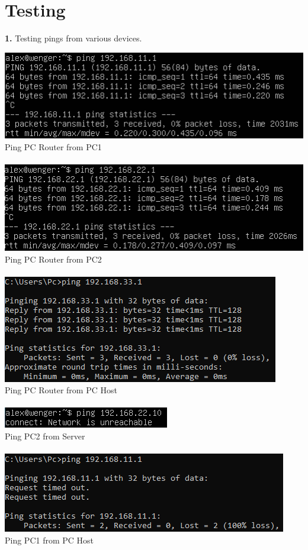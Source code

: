 \documentclass[12pt]{extarticle}
\begin{document}
\section{Testing}
\textbf{1.} Testing pings from various devices.\\
\begin{center}
\includegraphics[scale=0.8]{resources/2-1-1.png}\\
Ping PC Router from PC1\\~\\
\includegraphics[scale=0.8]{resources/2-1-2.png}\\
Ping PC Router from PC2\\~\\
\includegraphics[scale=0.8]{resources/2-1-3.png}\\
Ping PC Router from PC Host\\~\\
\includegraphics[scale=0.8]{resources/2-1-4.png}\\
Ping PC2 from Server\\~\\
\includegraphics[scale=0.8]{resources/2-1-5.png}\\
Ping PC1 from PC Host
\end{center}
\end{document}
